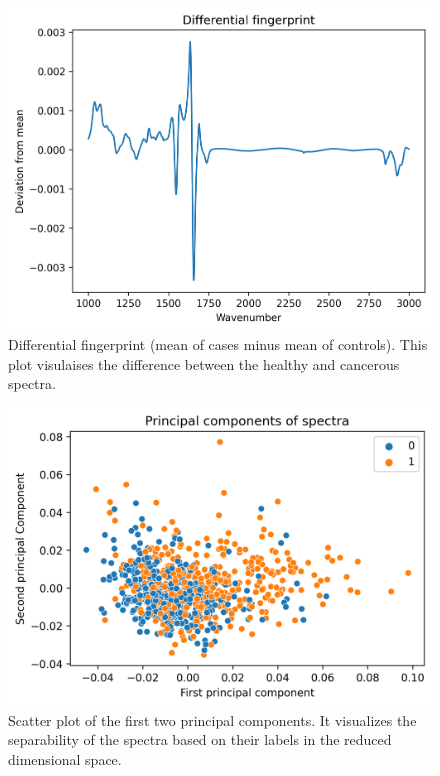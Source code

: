 \documentclass{cernatsnote}
\begin{document}
\begin{figure}[h!]
    \centering
    \includegraphics[width=1\linewidth]{images/DF.png}
    \caption{Differential fingerprint (mean of cases minus mean of controls). This plot visulaises the difference between the healthy and cancerous spectra.}
    \label{DF}
\end{figure}


\begin{figure}[h!]
    \centering
    \includegraphics[width=1\linewidth]{images/PCA.png}
    \caption{Scatter plot of the first two principal components. It visualizes the separability of the spectra based on their labels in the reduced dimensional space.}
    \label{PCA}
\end{figure}
\end{document}
